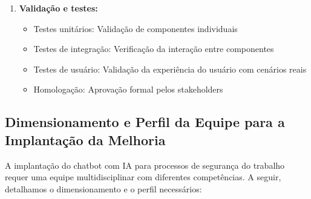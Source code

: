 \documentclass[12pt,a4paper]{article}
\begin{document}
\begin{enumerate}
    \item \textbf{Validação e testes:}
    \begin{itemize}
        \item Testes unitários: Validação de componentes individuais
        \item Testes de integração: Verificação da interação entre componentes
        \item Testes de usuário: Validação da experiência do usuário com cenários reais
        \item Homologação: Aprovação formal pelos stakeholders
    \end{itemize}
\end{enumerate}

\clearpage
\subsection{Dimensionamento e Perfil da Equipe para a Implantação da Melhoria}

A implantação do chatbot com IA para processos de segurança do trabalho requer uma equipe multidisciplinar com diferentes competências. A seguir, detalhamos o dimensionamento e o perfil necessários:
\end{document}
